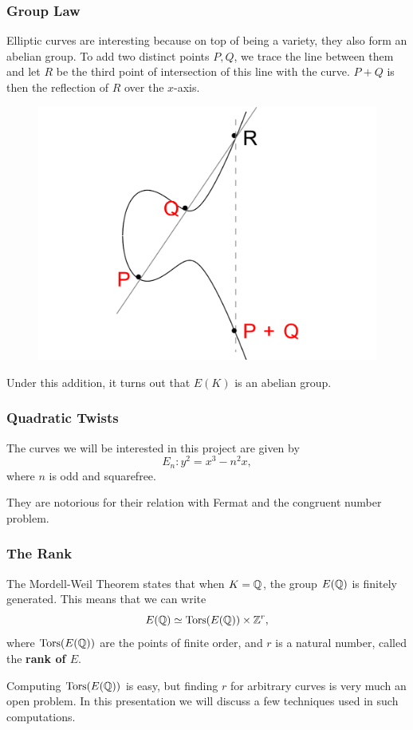 \documentclass{beamer}
\begin{document}
\begin{frame}
  \frametitle{Group Law}
  Elliptic curves are interesting because on top of being a variety, they also
  form an abelian group. To add two distinct points $P, Q$, we trace the line
  between them and let $R$ be the third point of intersection of this line with
  the curve. $P+Q$ is then the reflection of $R$ over the $x$-axis. \pause
  \begin{figure}
    \centering
  \includegraphics{picture3}
  \end{figure} \pause

  Under this addition, it turns out that $E(K)$ is an abelian group.
\end{frame}

\begin{frame}
  \frametitle{Quadratic Twists}
  The curves we will be interested in this project are given by
  \[E_n : y^2 = x^3 - n^2 x,\]
  where $n$ is odd and squarefree. \pause

  They are notorious for their relation with Fermat and the
  congruent number problem.
\end{frame}

\begin{frame}
  \frametitle{The Rank}
  The Mordell-Weil Theorem states that when $K = {\mathbb Q}$, the group $E({\mathbb Q})$ is
  finitely generated. This means that we can write
  \[E({\mathbb Q}) \simeq {\text{\normalfont Tors}}(E({\mathbb Q})) \times {\mathbb Z}^r,\]
  where ${\text{\normalfont Tors}}(E({\mathbb Q}))$ are the points of finite order, and $r$ is a natural
  number, called the \textbf{rank of $E$}. \pause
  \bigskip

  Computing ${\text{\normalfont Tors}}(E({\mathbb Q}))$ is easy, but finding $r$ for arbitrary
  curves is very much an open problem. In this presentation we will discuss a
  few techniques used in such computations.
\end{frame}
 
\end{document}
